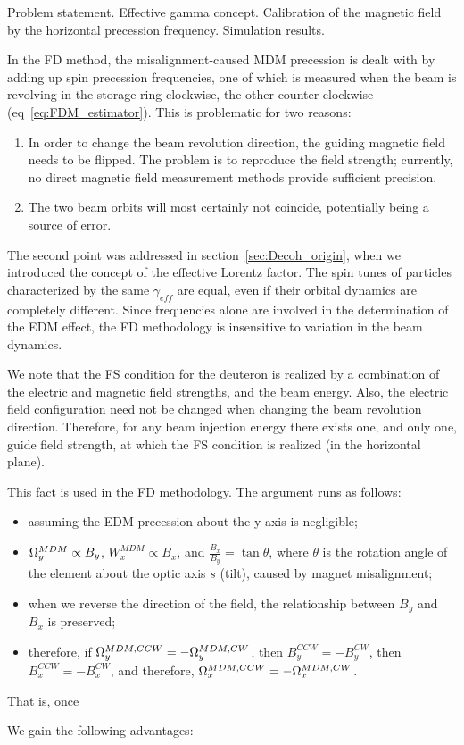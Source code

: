 \documentclass{article}
\begin{document}
Problem statement. Effective gamma concept. Calibration of the magnetic field by the horizontal precession frequency. Simulation results.
\newpage


In the FD method, the misalignment-caused MDM precession is dealt with by adding up spin precession frequencies, one of which is measured when the beam is revolving in the storage ring clockwise, the other counter-clockwise (eq~\eqref{eq:FDM_estimator}). This is problematic for two reasons:
\begin{enumerate}
\item In order to change the beam revolution direction, the guiding magnetic field needs to be flipped. The problem is to reproduce the field strength; currently, no direct magnetic field measurement methods provide sufficient precision.
\item The two beam orbits will most certainly not coincide, potentially being a source of error.
\end{enumerate}

The second point was addressed in section~\ref{sec:Decoh_origin}, when we introduced the concept of the effective Lorentz factor. The spin tunes of particles characterized by the same $\gamma_{eff}$ are equal, even if their orbital dynamics are completely different. Since frequencies alone are involved in the determination of the EDM effect, the FD methodology is insensitive to variation in the beam dynamics.


We note that the FS condition for the deuteron is realized by a combination of the electric and magnetic field strengths, and the beam energy. Also, the electric field configuration need not be changed when changing the beam revolution direction. Therefore, for any beam injection energy there exists one, and only one, guide field strength, at which the FS condition is realized (in the horizontal plane).

This fact is used in the FD methodology. The argument runs as follows:
\begin{itemize}
\item assuming the EDM precession about the y-axis is negligible;
  \item $\Omega_y^{MDM}\propto B_y$, $W_x^{MDM}\propto B_x$, and $\frac{B_x}{B_y} = \tan\theta$, where $\theta$ is the rotation angle of the element about the optic axis $s$ (tilt), caused by magnet misalignment;
\item when we reverse the direction of the field, the relationship between $B_y$ and $B_x$ is preserved;
\item therefore, if $\Omega_y^{MDM, CCW} = -\Omega_y^{MDM, CW}$, then $B_y^{CCW} = -B_y^{CW}$, then $B_x^{CCW} = -B_x^{CW}$, and therefore, $\Omega_x^{MDM, CCW} = -\Omega_x^{MDM, CW}$.
\end{itemize}
That is, once 

We gain the following advantages: 
\end{document}
